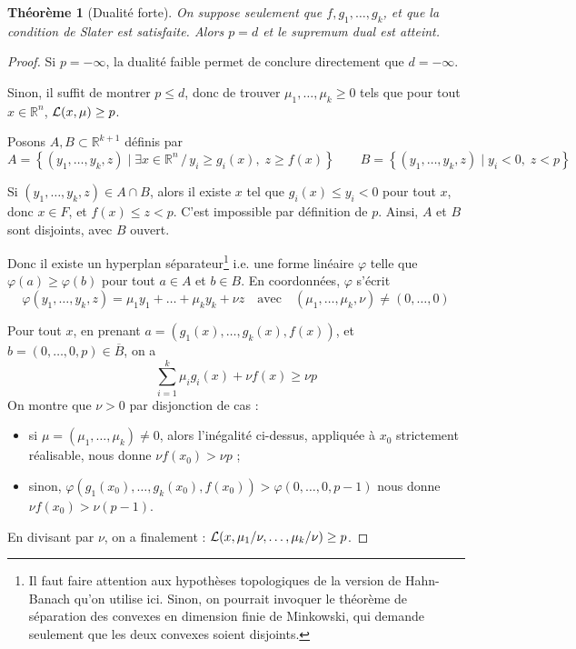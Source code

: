 \documentclass[a4paper, 11pt]{article}
\def\R{\mathbb{R}}
\def\L{{\cal{L}}}
\newtheorem*{theorem}{Théorème}
\begin{document}
\begin{theorem}[Dualité forte]
  On suppose seulement que $f, g_1, \ldots, g_k$, et que la condition de Slater
  est satisfaite. Alors $p = d$ et le supremum dual est atteint.
\end{theorem}
\begin{proof}
  Si $p = -\infty$, la dualité faible permet de conclure directement que $d =
  -\infty$.
  
  Sinon, il suffit de montrer $p \leq d$, donc de trouver $\mu_1, \ldots, \mu_k
  \geq 0$ tels que pour tout $x \in \R^n$, $\L(x,\mu) \geq p$.

  Posons $A, B \subset \R^{k+1}$ définis par
  \[ A = \left\{ (y_1, \ldots, y_k, z) \mid \exists x \in \R^n\,/\,
    y_i \geq g_i(x),\; z \geq f(x) \right\}
    \qquad B = \left\{ (y_1, \ldots, y_k, z) \mid y_i < 0,\;z < p \right\}\]

  Si $(y_1,\ldots,y_k,z) \in A \cap B$, alors il existe $x$ tel que $g_i(x) \leq
  y_i < 0$ pour tout $x$, donc $x \in F$, et $f(x) \leq z < p$. C'est impossible
  par définition de $p$. Ainsi, $A$ et $B$ sont disjoints, avec $B$ ouvert.
  
  Donc il existe un hyperplan séparateur\footnote{Il faut faire attention aux
    hypothèses topologiques de la version de Hahn-Banach qu'on utilise ici.
    Sinon, on pourrait invoquer le théorème de séparation des convexes en
    dimension finie de Minkowski, qui demande seulement que les deux convexes
    soient disjoints.} i.e. une forme linéaire $\varphi$ telle que $\varphi(a) \geq
  \varphi(b)$ pour tout $a \in A$ et $b \in B$. En coordonnées, $\varphi$ s'écrit
  \[ \varphi(y_1, \ldots, y_k, z) = \mu_1 y_1 + \ldots + \mu_k y_k + \nu z
    \quad \text{avec} \quad (\mu_1, \ldots, \mu_k, \nu) \neq (0, \ldots, 0)
  \]
  
  Pour tout $x$, en prenant $a = (g_1(x), \ldots, g_k(x), f(x))$, et $b = (0,
  \ldots, 0, p) \in \overline{B}$, on a
  \[ \sum_{i=1}^k \mu_i g_i(x) + \nu f(x) \geq \nu p \]
  On montre que $\nu > 0$ par disjonction de cas :
  \begin{itemize}
  \item si $\mu = (\mu_1, \ldots, \mu_k) \neq 0$, alors l'inégalité ci-dessus,
    appliquée à $x_0$ strictement réalisable, nous donne $\nu f(x_0) > \nu p$ ;
  \item sinon, $\varphi(g_1(x_0), \ldots, g_k(x_0), f(x_0)) > \varphi(0, \ldots,
    0, p-1)$ nous donne $\nu f(x_0) > \nu(p-1)$.
  \end{itemize}
  En divisant par $\nu$, on a finalement : $\L(x, \mu_1/\nu, \ldots, \mu_k/\nu)
  \geq p$.
\end{proof}
\end{document}
